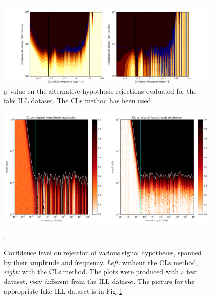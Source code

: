 \begin{figure}[htb]
  \begin{center}
    \includegraphics[width=\columnwidth]{gfx/axions/ILL_p_signal_and_cls_sensible.png}
    \caption{p-value on the alternative hypothesis rejections evaluated for the fake ILL dataset. The CLs method has been used. }
  \label{fig:ILL_exclusion}
  \end{center}
\end{figure}

\begin{figure}[htb]
  \centering \includegraphics[width=\linewidth]{gfx/axions/exclusion_no_CLs.png}
  \caption{Confidence level  on rejection of various signal hypotheses, spanned by their amplitude and frequency. \emph{Left:} without the CLs method, \emph{right:} with the CLs method. The plots were produced with a test dataset, very different from the ILL dataset. The picture for the appropriate fake ILL dataset is in Fig.\,\ref{fig:ILL_exclusion}}.
  \label{fig:exclusion_no_CLs}
\end{figure}

